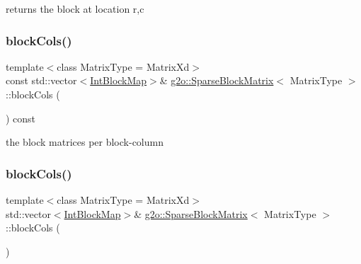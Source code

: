 returns the block at location r,c 

\mbox{\label{classg2o_1_1_sparse_block_matrix_ab818f8923b845d08a38e8de1145fbb65}} 
\subsubsection{\texorpdfstring{block\+Cols()}{blockCols()}\hspace{0.1cm}{\footnotesize\ttfamily [1/2]}}
{\footnotesize\ttfamily template$<$class Matrix\+Type = Matrix\+Xd$>$ \\
const std\+::vector$<$\mbox{\hyperlink{classg2o_1_1_sparse_block_matrix_aaa6ca1ae454ed70f62992b6401645f4e}{Int\+Block\+Map}}$>$\& \mbox{\hyperlink{classg2o_1_1_sparse_block_matrix}{g2o\+::\+Sparse\+Block\+Matrix}}$<$ Matrix\+Type $>$\+::block\+Cols (\begin{DoxyParamCaption}{ }\end{DoxyParamCaption}) const\hspace{0.3cm}{\ttfamily [inline]}}



the block matrices per block-\/column 

\mbox{\label{classg2o_1_1_sparse_block_matrix_a31236f3e11cb7af4979d68fdba3d5e33}} 
\subsubsection{\texorpdfstring{block\+Cols()}{blockCols()}\hspace{0.1cm}{\footnotesize\ttfamily [2/2]}}
{\footnotesize\ttfamily template$<$class Matrix\+Type = Matrix\+Xd$>$ \\
std\+::vector$<$\mbox{\hyperlink{classg2o_1_1_sparse_block_matrix_aaa6ca1ae454ed70f62992b6401645f4e}{Int\+Block\+Map}}$>$\& \mbox{\hyperlink{classg2o_1_1_sparse_block_matrix}{g2o\+::\+Sparse\+Block\+Matrix}}$<$ Matrix\+Type $>$\+::block\+Cols (\begin{DoxyParamCaption}{ }\end{DoxyParamCaption})\hspace{0.3cm}{\ttfamily [inline]}}

